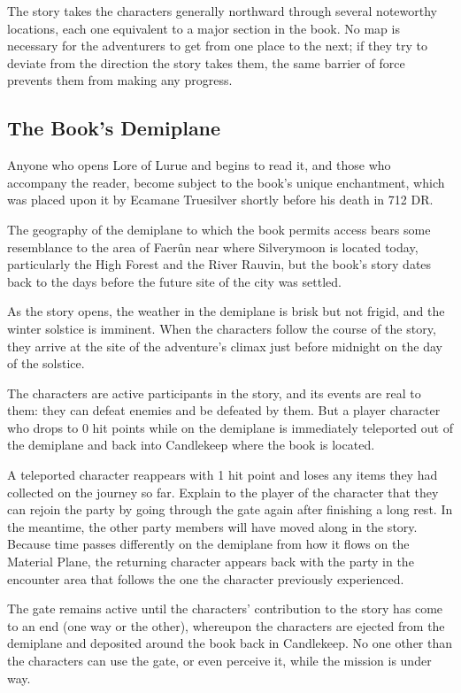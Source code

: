 \documentclass[10pt,a4paper,twoside,bg=print,twocolumn,openany,nodeprecatedcode]{dndbook}
\begin{document}
The story takes the characters generally northward through several noteworthy locations, each one equivalent to a major section in the book. No map is necessary for the adventurers to get from one place to the next; if they try to deviate from the direction the story takes them, the same barrier of force prevents them from making any progress.

\subsection{The Book's Demiplane}
Anyone who opens Lore of Lurue and begins to read it, and those who accompany the reader, become subject to the book's unique enchantment, which was placed upon it by Ecamane Truesilver shortly before his death in 712 DR.

The geography of the demiplane to which the book permits access bears some resemblance to the area of Faerûn near where Silverymoon is located today, particularly the High Forest and the River Rauvin, but the book's story dates back to the days before the future site of the city was settled.

As the story opens, the weather in the demiplane is brisk but not frigid, and the winter solstice is imminent. When the characters follow the course of the story, they arrive at the site of the adventure's climax just before midnight on the day of the solstice.

The characters are active participants in the story, and its events are real to them: they can defeat enemies and be defeated by them. But a player character who drops to 0 hit points while on the demiplane is immediately teleported out of the demiplane and back into Candlekeep where the book is located.

A teleported character reappears with 1 hit point and loses any items they had collected on the journey so far. Explain to the player of the character that they can rejoin the party by going through the gate again after finishing a long rest. In the meantime, the other party members will have moved along in the story. Because time passes differently on the demiplane from how it flows on the Material Plane, the returning character appears back with the party in the encounter area that follows the one the character previously experienced.

The gate remains active until the characters' contribution to the story has come to an end (one way or the other), whereupon the characters are ejected from the demiplane and deposited around the book back in Candlekeep. No one other than the characters can use the gate, or even perceive it, while the mission is under way.
\end{document}
